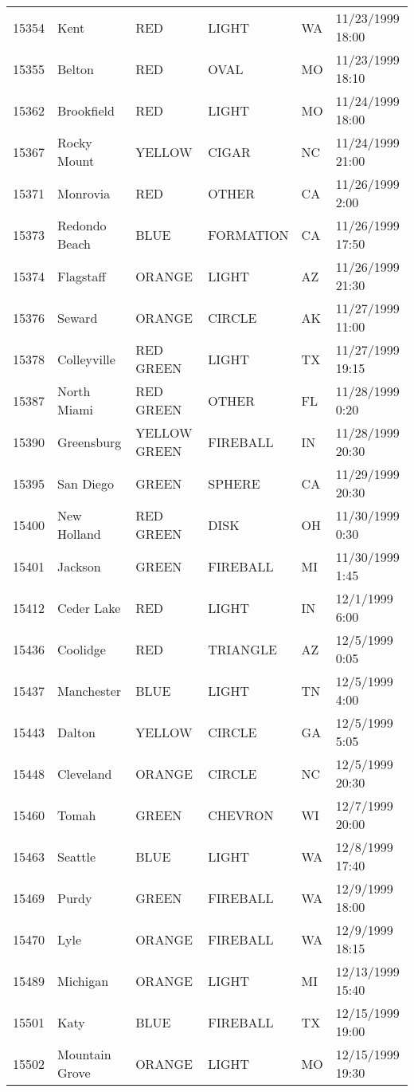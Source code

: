 \begin{tabular}{llllll}
15354 & Kent & RED & LIGHT & WA & 11/23/1999 18:00 \\
15355 & Belton & RED & OVAL & MO & 11/23/1999 18:10 \\
15362 & Brookfield & RED & LIGHT & MO & 11/24/1999 18:00 \\
15367 & Rocky Mount & YELLOW & CIGAR & NC & 11/24/1999 21:00 \\
15371 & Monrovia & RED & OTHER & CA & 11/26/1999 2:00 \\
15373 & Redondo Beach & BLUE & FORMATION & CA & 11/26/1999 17:50 \\
15374 & Flagstaff & ORANGE & LIGHT & AZ & 11/26/1999 21:30 \\
15376 & Seward & ORANGE & CIRCLE & AK & 11/27/1999 11:00 \\
15378 & Colleyville & RED GREEN & LIGHT & TX & 11/27/1999 19:15 \\
15387 & North Miami & RED GREEN & OTHER & FL & 11/28/1999 0:20 \\
15390 & Greensburg & YELLOW GREEN & FIREBALL & IN & 11/28/1999 20:30 \\
15395 & San Diego & GREEN & SPHERE & CA & 11/29/1999 20:30 \\
15400 & New Holland & RED GREEN & DISK & OH & 11/30/1999 0:30 \\
15401 & Jackson & GREEN & FIREBALL & MI & 11/30/1999 1:45 \\
15412 & Ceder Lake & RED & LIGHT & IN & 12/1/1999 6:00 \\
15436 & Coolidge & RED & TRIANGLE & AZ & 12/5/1999 0:05 \\
15437 & Manchester & BLUE & LIGHT & TN & 12/5/1999 4:00 \\
15443 & Dalton & YELLOW & CIRCLE & GA & 12/5/1999 5:05 \\
15448 & Cleveland & ORANGE & CIRCLE & NC & 12/5/1999 20:30 \\
15460 & Tomah & GREEN & CHEVRON & WI & 12/7/1999 20:00 \\
15463 & Seattle & BLUE & LIGHT & WA & 12/8/1999 17:40 \\
15469 & Purdy & GREEN & FIREBALL & WA & 12/9/1999 18:00 \\
15470 & Lyle & ORANGE & FIREBALL & WA & 12/9/1999 18:15 \\
15489 & Michigan & ORANGE & LIGHT & MI & 12/13/1999 15:40 \\
15501 & Katy & BLUE & FIREBALL & TX & 12/15/1999 19:00 \\
15502 & Mountain Grove & ORANGE & LIGHT & MO & 12/15/1999 19:30 \\

\end{tabular}
